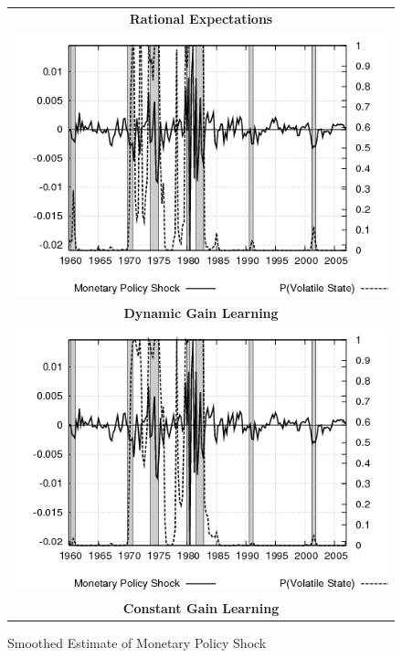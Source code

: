 \documentclass[12pt]{article}
\begin{document}
\begin{figure}[ht]
\begin{center}
\begin{tabular}{c}
\end{tabular}
\end{center}
\end{figure}

\begin{figure}[ht]
\caption{Smoothed Estimate of Monetary Policy Shock}\label{fg:mpshock}
\begin{center}
\begin{tabular}{c}
\textbf{Rational Expectations} \\  
\includegraphics[scale=0.5]{results_re/mpshock.png} \\
\textbf{Dynamic Gain Learning} \\
\includegraphics[scale=0.5]{results_dg8_wlsinit/mpshock.png} \\
\textbf{Constant Gain Learning} \\

\end{tabular}
\end{center}
\end{figure}
\end{document}
